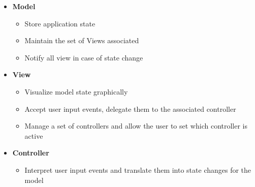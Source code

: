 \documentclass[11pt]{article}
\providecommand{\tightlist}{%
      \setlength{\itemsep}{0pt}\setlength{\parskip}{0pt}}
\begin{document}
\begin{itemize}
\tightlist
\item
  \textbf{Model}

  \begin{itemize}
  \tightlist
  \item
    Store application state
  \item
    Maintain the set of Views associated
  \item
    Notify all view in case of state change
  \end{itemize}
\item
  \textbf{View}

  \begin{itemize}
  \tightlist
  \item
    Visualize model state graphically
  \item
    Accept user input events, delegate them to the associated controller
  \item
    Manage a set of controllers and allow the user to set which
    controller is active
  \end{itemize}
\item
  \textbf{Controller}

  \begin{itemize}
  \tightlist
  \item
    Interpret user input events and translate them into state changes
    for the model
  \end{itemize}
\end{itemize}
\end{document}
